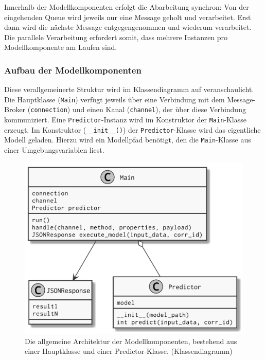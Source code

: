 Innerhalb der Modellkomponenten erfolgt die Abarbeitung synchron: Von der eingehenden Queue wird jeweils nur eine Message geholt und verarbeitet. Erst dann wird die nächste Message entgegengenommen und wiederum verarbeitet. Die parallele Verarbeitung erfordert somit, dass mehrere Instanzen pro Modellkomponente am Laufen sind.

\subsubsection{Aufbau der Modellkomponenten}
\label{sec:aufbau-der-modellkomponenten}

Diese verallgemeinerte Struktur wird im Klassendiagramm auf  veranschaulicht. Die Hauptklasse (\texttt{Main}) verfügt jeweils über eine Verbindung mit dem Message-Broker (\texttt{connection}) und einen Kanal (\texttt{channel}), der über diese Verbindung kommuniziert. Eine \texttt{Predictor}-Instanz wird im Konstruktor der \texttt{Main}-Klasse erzeugt. Im Konstruktor (\texttt{\_\_init\_\_()}) der \texttt{Predictor}-Klasse wird das eigentliche Modell geladen. Hierzu wird ein Modellpfad benötigt, den die \texttt{Main}-Klasse aus einer Umgebungsvariablen liest.

\begin{figure}[tbh]
    \centering
    \includegraphics[width=0.9\linewidth]{pics/class-generic.png}
    \caption{Die allgemeine Architektur der Modellkomponenten, bestehend aus einer Hauptklasse und einer Predictor-Klasse. (Klassendiagramm)}
    \label{fig:klassendiagramm-generisch}
\end{figure}

